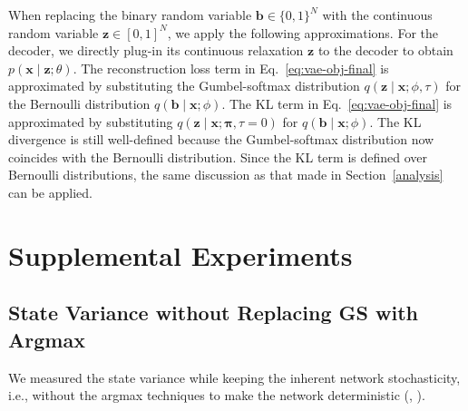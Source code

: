 \documentclass[10pt,letterpaper]{article}
\newcommand{\bx}{\mathbf{x}}
\newcommand{\bz}{\mathbf{z}}
\newcommand{\bb}{\mathbf{b}}
\begin{document}
When replacing the binary random variable $\mathbf{b}\in\{0,1\}^N$ with the continuous random variable $\mathbf{z}\in[0,1]^N$, we apply the following approximations.
For the decoder, we directly plug-in its continuous relaxation $\bz$ to the decoder to obtain $p(\bx \mid \bz;\theta)$.
The reconstruction loss term in Eq.~\eqref{eq:vae-obj-final} is approximated by substituting the Gumbel-softmax distribution $q(\bz \mid \bx;\phi,\tau)$ for the Bernoulli distribution $q(\bb \mid \bx;\phi)$.
The KL term in Eq.~\eqref{eq:vae-obj-final} is approximated by substituting $q(\bz \mid \bx;\bm{\pi},\tau=0)$ for $q(\bb \mid \bx;\phi)$.
The KL divergence is still well-defined because the Gumbel-softmax distribution now coincides with the Bernoulli distribution.
Since the KL term is defined over Bernoulli distributions, the same discussion as that made in Section~\ref{analysis} can be applied.

\section{Supplemental Experiments}


\subsection{State Variance without Replacing GS with Argmax}

We measured the state variance while keeping the inherent network stochasticity,
i.e., without the argmax techniques to
make the network deterministic (, ).
\end{document}
